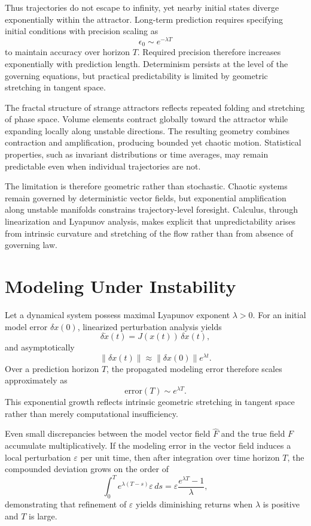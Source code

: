 \documentclass[12pt]{book}
\begin{document}
Thus trajectories do not escape to infinity, yet nearby initial states diverge exponentially within the attractor. Long-term prediction requires specifying initial conditions with precision scaling as
\[
\epsilon_0 \sim e^{-\lambda T}
\]
to maintain accuracy over horizon $T$. Required precision therefore increases exponentially with prediction length. Determinism persists at the level of the governing equations, but practical predictability is limited by geometric stretching in tangent space.

The fractal structure of strange attractors reflects repeated folding and stretching of phase space. Volume elements contract globally toward the attractor while expanding locally along unstable directions. The resulting geometry combines contraction and amplification, producing bounded yet chaotic motion. Statistical properties, such as invariant distributions or time averages, may remain predictable even when individual trajectories are not.

The limitation is therefore geometric rather than stochastic. Chaotic systems remain governed by deterministic vector fields, but exponential amplification along unstable manifolds constrains trajectory-level foresight. Calculus, through linearization and Lyapunov analysis, makes explicit that unpredictability arises from intrinsic curvature and stretching of the flow rather than from absence of governing law.

\section{Modeling Under Instability}

Let a dynamical system possess maximal Lyapunov exponent $\lambda > 0$. For an initial model error $\delta x(0)$, linearized perturbation analysis yields
\[
\delta \dot{x}(t) = J(x(t))\,\delta x(t),
\]
and asymptotically
\[
\|\delta x(t)\| \approx \|\delta x(0)\| e^{\lambda t}.
\]
Over a prediction horizon $T$, the propagated modeling error therefore scales approximately as
\[
\mathrm{error}(T) \sim e^{\lambda T}.
\]
This exponential growth reflects intrinsic geometric stretching in tangent space rather than merely computational insufficiency.

Even small discrepancies between the model vector field $\widehat{F}$ and the true field $F$ accumulate multiplicatively. If the modeling error in the vector field induces a local perturbation $\varepsilon$ per unit time, then after integration over time horizon $T$, the compounded deviation grows on the order of
\[
\int_0^T e^{\lambda (T-s)} \varepsilon \, ds
=
\varepsilon \frac{e^{\lambda T}-1}{\lambda},
\]
demonstrating that refinement of $\varepsilon$ yields diminishing returns when $\lambda$ is positive and $T$ is large.
\end{document}
